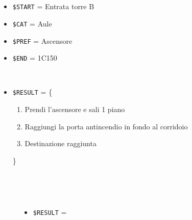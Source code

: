 \documentclass[../../SperimentazioniPratiche.tex]{subfiles}
\begin{document}
			\paragraph*{}	
			\label{2Prova2A.1}
			\begin{tcolorbox}[fonttitle=\bfseries, 
								adjusted title={\Large Prova 2A.1}, 
								breakable, 
								sharp corners=south,
								colback=white, 
								colframe=white!60!black]
								
				\begin{description}[leftmargin=0.7cm,labelwidth=!]
				
					\item[Input] \ \par 
        				\begin{itemize}
        					\item \verb|$START| = Entrata torre B
							\item \verb|$CAT| = Aule
							\item \verb|$PREF| = Ascensore
        					\item \verb|$END| = 1C150
        				\end{itemize}
        				
        			\tcbline 
        				
        			\item[Output atteso] \ \par
        				\begin{itemize}
        					\item \verb|$RESULT| = \{
        						\begin{enumerate}
        							\item Prendi l'ascensore e sali 1 piano
									\item Raggiungi la porta antincendio in fondo al corridoio
									\item Destinazione raggiunta
        						\end{enumerate}
        					\}
        				\end{itemize}

					\tcbline        				
        				
        			\item[Output riscontrato] \ \par
        				\begin{description}
        				
        					\item[\dispositivoA] \ \par
        					\begin{itemize}
        						\item \verb|$RESULT| = \ok
        					\end{itemize}      					
        					

\end{description}
\end{description}
\end{tcolorbox}
\end{document}
